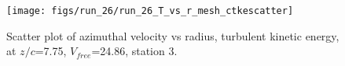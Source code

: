 \begin{figure}[H]
\centering
\texttt{[image: figs/run\_26/run\_26\_T\_vs\_r\_mesh\_ctkescatter]}
\caption{Scatter plot of azimuthal velocity vs radius, turbulent kinetic energy, at $z/c$=7.75, $V_{free}$=24.86, station 3.}
\label{fig:run_26_T_vs_r_mesh_ctkescatter}
\end{figure}


